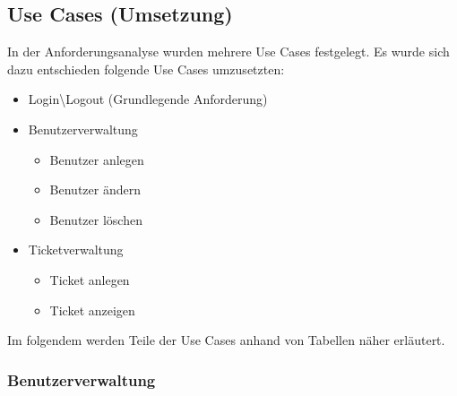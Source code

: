 \documentclass[12pt, a4paper]{article}
\begin{document}
\subsection{Use Cases (Umsetzung)}
In der Anforderungsanalyse wurden mehrere Use Cases festgelegt. Es wurde sich dazu entschieden folgende Use Cases umzusetzten:
\begin{itemize}
\item Login\textbackslash Logout (Grundlegende Anforderung)
\item Benutzerverwaltung
\begin{itemize}
\item Benutzer anlegen
\item Benutzer ändern
\item Benutzer löschen

\end{itemize}
\item Ticketverwaltung
\begin{itemize}
\item Ticket anlegen
\item Ticket anzeigen
\end{itemize}


\end{itemize}

Im folgendem werden Teile der Use Cases anhand von Tabellen näher erläutert.




\subsubsection{Benutzerverwaltung}
\end{document}
